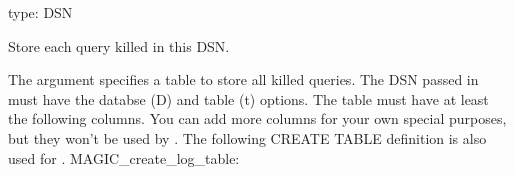 \documentclass[letterpaper,10pt,english]{sphinxmanual}
\begin{document}

\begin{fulllineitems}
\label{\detokenize{mariadb-kill:cmdoption-mariadb-kill-log-dsn}}
\sphinxAtStartPar
type: DSN

\sphinxAtStartPar
Store each query killed in this DSN.

\sphinxAtStartPar
The argument specifies a table to store all killed queries.  The DSN
passed in must have the databse (D) and table (t) options. The
table must have at least the following columns.  You can add more columns for
your own special purposes, but they won’t be used by .  The
following CREATE TABLE definition is also used for {\hyperref[\detokenize{mariadb-kill:cmdoption-mariadb-kill-create-log-table}]{}}.
MAGIC\_create\_log\_table:


\end{fulllineitems}
\end{document}
